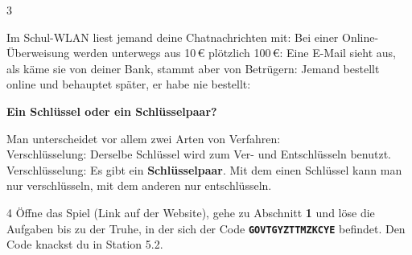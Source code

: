 \documentclass[11pt,a4paper]{article}
\begin{document}
\begin{aufgabe}{3}
{\lueckentext
{} Im Schul-WLAN liest jemand deine Chatnachrichten mit: 
 Bei einer Online-Überweisung werden unterwegs aus 10\,€ plötzlich 100\,€: 
 Eine E-Mail sieht aus, als käme sie von deiner Bank, stammt aber von Betrügern: 
 Jemand bestellt online und behauptet später, er habe nie bestellt: 
\par}
\end{aufgabe}

\textbf{Ein Schlüssel oder ein Schlüsselpaar?}\par
{\lueckentext Man unterscheidet vor allem zwei Arten von Verfahren:\\
 Verschlüsselung: Derselbe Schlüssel wird zum Ver- und Entschlüsseln benutzt.\\
 Verschlüsselung: Es gibt ein \textbf{Schlüsselpaar}. Mit dem einen Schlüssel kann man nur verschlüsseln, mit dem anderen nur entschlüsseln.\par}

\begin{aufgabe}{4}
Öffne das Spiel (Link auf der Website), gehe zu Abschnitt \textbf{1} und löse die Aufgaben bis zu der Truhe, in der sich der Code \texttt{\bfseries GOVTGYZTTMZKCYE} befindet. Den Code knackst du in Station 5.2.
\end{aufgabe}

\vfill
{}
\end{document}
